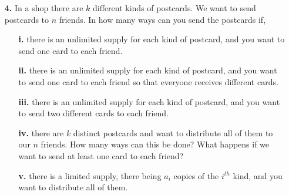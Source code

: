 \documentclass[ 12pt ]{article}
\begin{document}
\begin{enumerate}
	\item[\textbf{4.}] In a shop there are $k$ different kinds of postcards. We want to send postcards to $n$ friends. In how many ways can you send the postcards if,
		\begin{enumerate}
			\item[\textbf{i.}] there is an unlimited supply for each kind of postcard, and you want to send one card to each friend.
			\item[\textbf{ii.}] there is an unlimited supply for each kind of postcard, and you want to send one card to each friend so that everyone receives different cards.
			\item[\textbf{iii.}] there is an unlimited supply for each kind of postcard, and you want to send two different cards to each friend.
			\item[\textbf{iv.}] there are $k$ distinct postcards and want to distribute all of them to our $n$ friends. How many ways can this be done? What happens if we want to send
				at least one card to each friend?
			\item[\textbf{v.}] there is a limited supply, there being $a_i$ copies of the $i^{th}$ kind, and you want to distribute all of them.
		\end{enumerate}


\end{enumerate}
\end{document}
